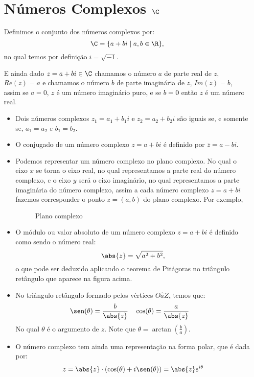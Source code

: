  \chapter{Números Complexos {$\C$}}

 \vskip0.3cm
 \colorbox{azul}{
 \begin{minipage}{0.9\linewidth}
 \begin{center}
  Definimos o conjunto dos números complexos por:
 \[\C= \{a + bi \mid a, b \in \R \} ,\]
 no qual temos por definição $i= \sqrt{-1}$.
 \end{center}
 \end{minipage}}
 \vskip0.3cm

 E ainda dado $z= a+bi \in \C$ chamamos o número $a$ de parte real de $z$, $Re(z)= a$ e chamamos o número $b$ de parte imaginária de $z$, $Im(z)= b$, assim se $a=0$, $z$ é um número imaginário puro, e se $b=0$ então $z$ é um número real.

 \begin{defi}
 \begin{itemize}
 \item Dois números complexos $z_1= a_1 + b_1i$ e $z_2= a_2 + b_2i$ são iguais se, e somente se, $a_1=a_2$ e $b_1= b_2$.
 \item O conjugado de um número complexo $z= a+bi$ é definido por $\overline{z}= a - bi$.
 \item Podemos representar um número complexo no plano complexo. No qual o eixo $x$ se torna o eixo real, no qual representamos a parte real do número complexo, e o eixo $y$ será o eixo imaginário, no qual representamos a parte imaginária do número complexo, assim a cada número complexo $z= a+bi$ fazemos corresponder o ponto $z= (a, b)$ do plano complexo. Por exemplo,

 \begin{figure}[H]
   \centering
   \caption{Plano complexo}
  \end{figure}

 \item O módulo ou valor absoluto de um número complexo $z= a+bi$ é definido como sendo o número real:
 \[\abs{z}= \sqrt{a^2 + b^2},\]
 o que pode ser deduzido aplicando o teorema de Pitágoras no triângulo retângulo que aparece na figura acima.
 \item No triângulo retângulo formado pelos vértices $O\hat{a}Z$, temos que:
  \begin{align*}
 & \sen(\theta)= \frac{b}{\abs{z}} & & \cos(\theta)= \frac{a}{\abs{z}} &
 \end{align*}
 No qual $\theta$ é o argumento de $z$. Note que $\theta= \arctan \left( \frac{b}{a} \right)$.

 \item O número complexo tem ainda uma representação na forma polar, que é dada por:
 \[z= \abs{z}\cdot (\cos(\theta) + i \sen(\theta))= \abs{z} e^{i \theta} \]

 \end{itemize}
 \end{defi}

